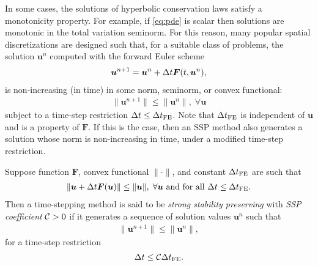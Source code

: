In some cases, the solutions of hyperbolic conservation laws satisfy a 
monotonicity property. For example, if \eqref{eq:pde} is scalar then solutions 
are monotonic in the total variation seminorm.
For this reason, many popular spatial discretizations are designed such 
that, for a suitable class of problems, the solution $\bm{u}^{n}$ 
computed with the forward Euler scheme
\begin{align}\label{eq:forwardEuler}
    \bm{u}^{n+1} = \bm{u}^{n} + \Delta t\bm{F}(t,\bm{u}^{n}),
\end{align}
is non-increasing (in time)
in some norm, seminorm, or convex functional:
\begin{align*}
    \|\bm{u}^{n+1}\| \le \|\bm{u}^n\|, \; \forall \bm{u}
\end{align*}
subject to a time-step restriction $\Delta t \leq \Delta t_{\textnormal{FE}}$.
Note that $\Delta t_{\textnormal{FE}}$ is independent of $\bm{u}$ and is a property of $\bm{F}$.
If this is the case, then an SSP method also generates a solution whose norm is
non-increasing in time, under a modified time-step restriction. 
\begin{definition}
	Suppose function $\bm{F}$, convex functional $\|\cdot\|$, and
	constant $\Delta t_{\textnormal{FE}}$ are such that
	\begin{align*}
		\|\bm{u} + \Delta t\bm{F}(\bm{u})\| \le \|\bm{u}\|, \; \forall \bm{u}
		\text{ and  for all } \Delta t \le \Delta t_{\textnormal{FE}}.
	\end{align*}
	Then a time-stepping method is said to be \emph{strong stability
  	preserving} with \emph{SSP coefficient} $\mathcal{C} > 0$ if it
	generates a sequence of solution values $\bm{u}^n$ such that
	\begin{align*}
  		\|\bm{u}^{n+1}\| \le \|\bm{u}^n\|,
	\end{align*}
	for a time-step restriction
	\begin{align*}
		\Delta t \leq \mathcal{C} \Delta t_{\textnormal{FE}}.
	\end{align*}
\end{definition}
